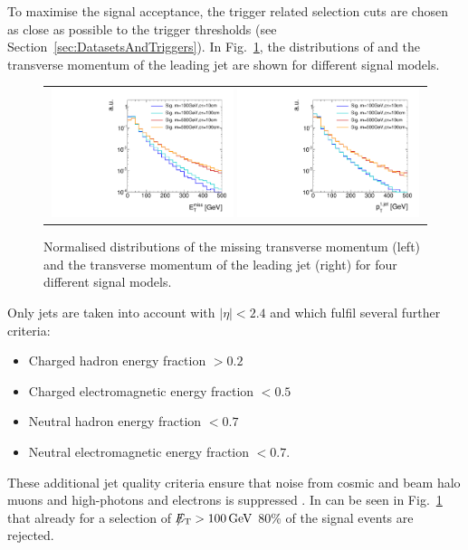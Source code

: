 To maximise the signal acceptance, the trigger related selection cuts are chosen as close as possible to the trigger thresholds (see Section~\ref{sec:DatasetsAndTriggers}).
In Fig.~\ref{fig:SignalMET+SignalJetPt}, the distributions of \met and the transverse momentum of the leading jet \ptfirstjet are shown for different signal models.
\begin{figure}[!tb]
  \centering 
  \begin{tabular}{c}
    \includegraphics[width=0.49\textwidth]{figures/analysis/AnalysisSelection/hMetSmallRange_log_chiTracksnoSelection_4Signals.pdf}
    \includegraphics[width=0.49\textwidth]{figures/analysis/AnalysisSelection/h1stjetptSmallRange_log_chiTracksnoSelection_4Signals.pdf}
  \end{tabular}
  \caption{Normalised distributions of the missing transverse momentum (left) and the transverse momentum of the leading jet (right) for four different signal models.}
  \label{fig:SignalMET+SignalJetPt}
\end{figure}
Only jets are taken into account with $|\eta|<2.4$ and which fulfil several further criteria:
\begin{itemize}
\item Charged hadron energy fraction $>0.2$
\item Charged electromagnetic energy fraction $<0.5$
\item Neutral hadron energy fraction $<0.7$
\item Neutral electromagnetic energy fraction $<0.7$.
\end{itemize}
These additional jet quality criteria ensure that noise from cosmic and beam halo muons and high-\pt photons and electrons is suppressed \cite{bib:CMS:DM_8TeV_AN}.
In can be seen in Fig.~\ref{fig:SignalMET+SignalJetPt} that already for a selection of $\slash\mkern-12mu{E}_{\text{T}}>100\,\text{Ge}\kern-0.06667em\text{V}$ 80\% of the signal events are rejected.

